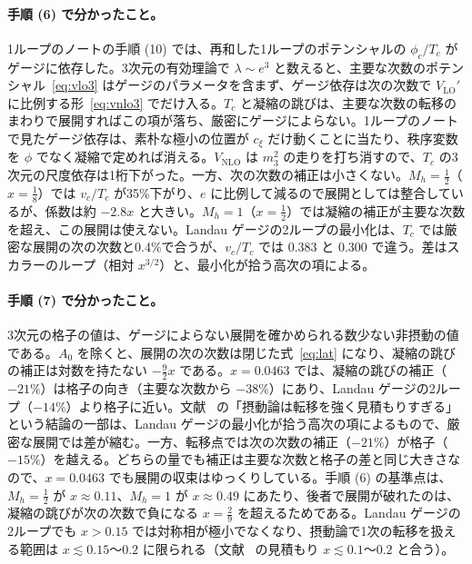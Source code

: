 \documentclass[a4paper,10pt]{ltjsarticle}
\begin{document}
\paragraph{手順 (6) で分かったこと。}1ループのノートの手順 (10) では、再和した1ループのポテンシャルの $\phi_c/T_c$ がゲージに依存した。3次元の有効理論で $\lambda\sim e^3$ と数えると、主要な次数のポテンシャル~\eqref{eq:vlo3} はゲージのパラメータを含まず、ゲージ依存は次の次数で $V_{\mathrm{LO}}'$ に比例する形~\eqref{eq:vnlo3} でだけ入る。$T_c$ と凝縮の跳びは、主要な次数の転移のまわりで展開すればこの項が落ち、厳密にゲージによらない。1ループのノートで見たゲージ依存は、素朴な極小の位置が $c_\xi$ だけ動くことに当たり、秩序変数を $\phi$ でなく凝縮で定めれば消える。$V_{\mathrm{NLO}}$ は $m_3^2$ の走りを打ち消すので、$T_c$ の3次元の尺度依存は1桁下がった。一方、次の次数の補正は小さくない。$M_h=\frac12$（$x=\frac18$）では $v_c/T_c$ が35\%下がり、$e$ に比例して減るので展開としては整合しているが、係数は約 $-2.8x$ と大きい。$M_h=1$（$x=\frac12$）では凝縮の補正が主要な次数を超え、この展開は使えない。Landau ゲージの2ループの最小化は、$T_c$ では厳密な展開の次の次数と0.4\%で合うが、$v_c/T_c$ では $0.383$ と $0.300$ で違う。差はスカラーのループ（相対 $x^{3/2}$）と、最小化が拾う高次の項による。

\paragraph{手順 (7) で分かったこと。}3次元の格子の値は、ゲージによらない展開を確かめられる数少ない非摂動の値である。$A_0$ を除くと、展開の次の次数は閉じた式~\eqref{eq:lat} になり、凝縮の跳びの補正は対数を持たない $-\frac92x$ である。$x=0.0463$ では、凝縮の跳びの補正（$-21\%$）は格子の向き（主要な次数から $-38\%$）にあり、Landau ゲージの2ループ（$-14\%$）より格子に近い。文献~\cite{kklp98} の「摂動論は転移を強く見積もりすぎる」という結論の一部は、Landau ゲージの最小化が拾う高次の項によるもので、厳密な展開では差が縮む。一方、転移点では次の次数の補正（$-21\%$）が格子（$-15\%$）を越える。どちらの量でも補正は主要な次数と格子の差と同じ大きさなので、$x=0.0463$ でも展開の収束はゆっくりしている。手順 (6) の基準点は、$M_h=\frac12$ が $x\approx0.11$、$M_h=1$ が $x\approx0.49$ にあたり、後者で展開が破れたのは、凝縮の跳びが次の次数で負になる $x=\frac29$ を超えるためである。Landau ゲージの2ループでも $x>0.15$ では対称相が極小でなくなり、摂動論で1次の転移を扱える範囲は $x\lesssim0.15$〜$0.2$ に限られる（文献~\cite{kklp98} の見積もり $x\lesssim0.1$〜$0.2$ と合う）。
\end{document}
